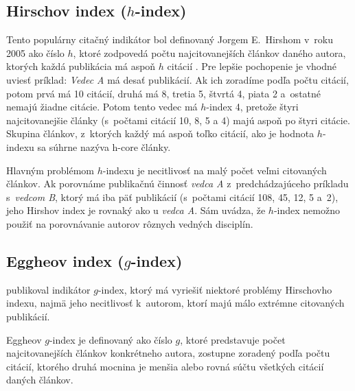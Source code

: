 \subsection{Hirschov index ($h$-index)}
\label{sec:h-index}

Tento populárny citačný indikátor bol definovaný Jorgem E.~Hirshom v~roku 2005
ako číslo $h$, ktoré zodpovedá počtu najcitovanejších článkov daného autora,
ktorých každá publikácia má aspoň $h$ citácií \citep{Hirsch2005}.  Pre lepšie
pochopenie je vhodné uviesť príklad: \emph{Vedec A} má desať publikácií.  Ak ich
zoradíme podľa počtu citácií, potom prvá má 10 citácií, druhá má 8, tretia 5,
štvrtá 4, piata 2 a~ostatné nemajú žiadne citácie.  Potom tento vedec má
$h$-index 4, pretože štyri najcitovanejšie články (s~počtami citácií 10, 8, 5 a
4) majú aspoň po štyri citácie.  Skupina článkov, z~ktorých každý má aspoň toľko
citácií, ako je hodnota $h$-indexu sa súhrne nazýva h-core články.

Hlavným problémom $h$-indexu je necitlivosť na malý počet veľmi citovaných
článkov.  Ak porovnáme publikačnú činnosť \emph{vedca A} z~predchádzajúceho
príkladu s~\emph{vedcom B}, ktorý má iba päť publikácií (s~počtami citácií 108,
45, 12, 5 a~2), jeho Hirshov index je rovnaký ako u \emph{vedca A}.  Sám
\citet{Hirsch2005} uvádza, že $h$-index nemožno použiť na porovnávanie autorov
rôznych vedných disciplín.


\subsection{Eggheov index ($g$-index)}
\label{sec:g-index}

\citet{Egghe2006} publikoval indikátor $g$-index, ktorý má
vyriešiť niektoré problémy Hirsch\-ovho indexu, najmä jeho necitlivosť
k~autorom, ktorí majú málo extrémne citovaných publikácií.

Eggheov $g$-index je definovaný ako číslo $g$, ktoré predstavuje počet
najcitovanejších článkov konkrétneho autora, zostupne zoradený podľa počtu
citácií, ktorého druhá mocnina je menšia alebo rovná súčtu všetkých citácií
daných článkov.


